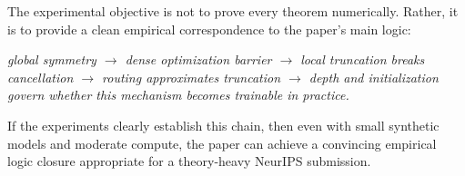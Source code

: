 \documentclass[11pt]{article}
\begin{document}
The experimental objective is not to prove every theorem numerically. Rather, it is to provide a clean empirical correspondence to the paper's main logic:
\begin{center}
\emph{global symmetry $\rightarrow$ dense optimization barrier $\rightarrow$ local truncation breaks cancellation $\rightarrow$ routing approximates truncation $\rightarrow$ depth and initialization govern whether this mechanism becomes trainable in practice.}
\end{center}

If the experiments clearly establish this chain, then even with small synthetic models and moderate compute, the paper can achieve a convincing empirical logic closure appropriate for a theory-heavy NeurIPS submission.









\end{document}
